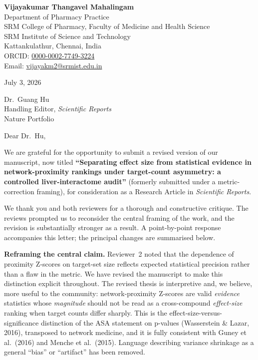\documentclass[11pt]{article}
\begin{document}
\noindent
\textbf{Vijayakumar Thangavel Mahalingam} \\
Department of Pharmacy Practice \\
SRM College of Pharmacy, Faculty of Medicine and Health Science \\
SRM Institute of Science and Technology \\
Kattankulathur, Chennai, India \\
ORCID: \href{https://orcid.org/0000-0002-7749-3224}{0000-0002-7749-3224} \\
Email: \href{mailto:vijayakm2@srmist.edu.in}{vijayakm2@srmist.edu.in}

\bigskip

\noindent
July 3, 2026

\bigskip

\noindent
Dr.\ Guang Hu \\
Handling Editor, \textit{Scientific Reports} \\
Nature Portfolio

\bigskip

\noindent
Dear Dr.\ Hu,

\onehalfspacing

We are grateful for the opportunity to submit a revised version of our manuscript, now titled \textbf{``Separating effect size from statistical evidence in network-proximity rankings under target-count asymmetry: a controlled liver-interactome audit''} (formerly submitted under a metric-correction framing), for consideration as a Research Article in \textit{Scientific Reports}.

We thank you and both reviewers for a thorough and constructive critique. The reviews prompted us to reconsider the central framing of the work, and the revision is substantially stronger as a result. A point-by-point response accompanies this letter; the principal changes are summarised below.

\bigskip
\noindent \textbf{Reframing the central claim.}
Reviewer~2 noted that the dependence of proximity Z-scores on target-set size reflects expected statistical precision rather than a flaw in the metric. We have revised the manuscript to make this distinction explicit throughout. The revised thesis is interpretive and, we believe, more useful to the community: network-proximity Z-scores are valid \emph{evidence} statistics whose \emph{magnitude} should not be read as a cross-compound \emph{effect-size} ranking when target counts differ sharply. This is the effect-size-versus-significance distinction of the ASA statement on p-values (Wasserstein \& Lazar, 2016), transposed to network medicine, and it is fully consistent with Guney et al.\ (2016) and Menche et al.\ (2015). Language describing variance shrinkage as a general ``bias'' or ``artifact'' has been removed.
\end{document}
